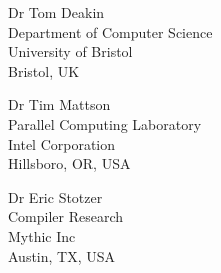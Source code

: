 \documentclass[7x10]{NewMath_MIT}
\begin{document}


\mainmatter











\backmatter
{}



\theendnotes

\let\bibname\refname
\printbibliography

\begin{contributors}[twocolumn]

\contrib
Dr Tom Deakin\\
Department of Computer Science\\
University of Bristol\\
Bristol, UK

\contrib
Dr Tim Mattson\\
Parallel Computing Laboratory\\
Intel Corporation\\
Hillsboro, OR, USA

\contrib
Dr Eric Stotzer\\
Compiler Research\\
Mythic Inc\\
Austin, TX, USA
\end{contributors}

\printindex
\end{document}
